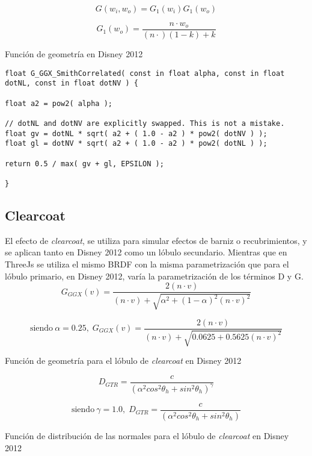   $$
  G(w_i, w_o) = G_1(w_i)G_1(w_o)
  $$

  \begin{eqfloat}[!htb]
    \begin{equation}
      G_1(w_o) = \frac{n\cdot{w_o}}{(n\cdot) (1 - k) + k}
    \end{equation}
  \caption{Funci\'on de geometr\'ia en Disney 2012}
  \end{eqfloat}
  \singlespacing

\begin{lstlisting}[caption=Clase MeshClothMaterial]
float G_GGX_SmithCorrelated( const in float alpha, const in float dotNL, const in float dotNV ) {

float a2 = pow2( alpha );

// dotNL and dotNV are explicitly swapped. This is not a mistake.
float gv = dotNL * sqrt( a2 + ( 1.0 - a2 ) * pow2( dotNV ) );
float gl = dotNV * sqrt( a2 + ( 1.0 - a2 ) * pow2( dotNL ) );

return 0.5 / max( gv + gl, EPSILON );

}
\end{lstlisting}

  \subsection{Clearcoat}
  El efecto de \textit{clearcoat}, se utiliza para simular efectos de barniz o recubrimientos, y se aplican tanto en Disney
  2012 como un l\'obulo secundario. Mientras que en ThreeJs se utiliza el mismo BRDF con la misma parametrizaci\'on que para
  el l\'obulo primario, en Disney 2012, var\'ia la parametrizaci\'on de los t\'erminos D y G.\\

  $$
  G_{GGX}(v) = \frac
  {2 (n \cdot{v})}
  {(n \cdot{v}) + \sqrt{ \alpha^2 + (1 - \alpha)^2 (n \cdot{v})^2 }}
  $$
  \begin{eqfloat}[!htb]
    \begin{equation}
    \textrm{siendo}\ \alpha=0.25,\;
    G_{GGX}(v) = \frac
    {2 (n \cdot{v})}
    {(n \cdot{v}) + \sqrt{ 0.0625 + 0.5625 (n \cdot{v})^2 }}
    \end{equation}
  \caption{Funci\'on de geometr\'ia para el l\'obulo de \textit{clearcoat} en Disney 2012}
  \end{eqfloat}
  \singlespacing

  $$
  D_{GTR} = \frac
  {c}
  {(\alpha^2 cos^2 \theta_h + sin^2 \theta_h)^\gamma}
  $$
  \begin{eqfloat}[!htb]
    \begin{equation}
    \textrm{siendo}\ \gamma=1.0,\;
    D_{GTR} = \frac
    {c}
    {(\alpha^2 cos^2 \theta_h + sin^2 \theta_h)}
    \end{equation}
  \caption{Funci\'on de distribuci\'on de las normales para el l\'obulo de \textit{clearcoat} en Disney 2012}
  \end{eqfloat}
  \singlespacing
  
